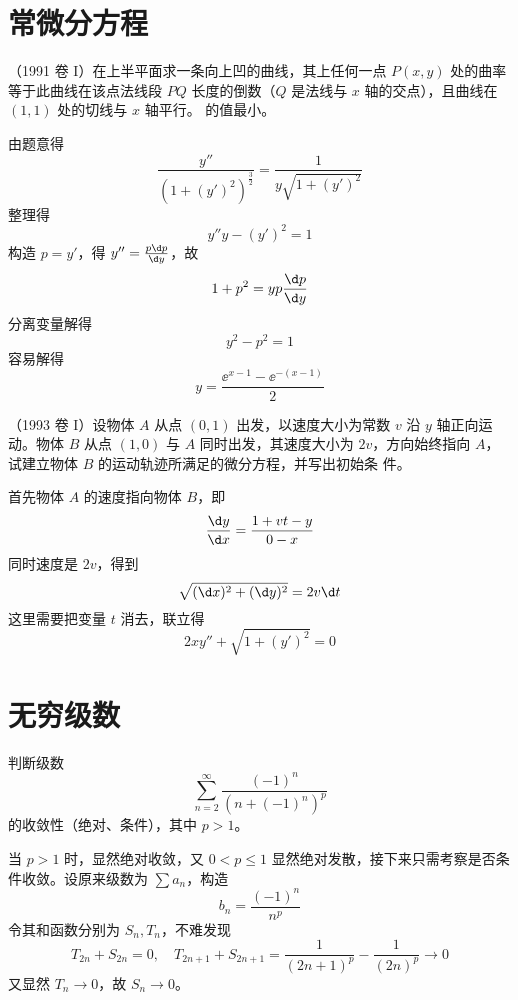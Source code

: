 \section{常微分方程}

\begin{problem}[000061]
（1991 卷 I）在上半平面求一条向上凹的曲线，其上任何一点 $P(x, y)$ 处的曲率等于此曲线在该点法线段 $PQ$ 长度的倒数（$Q$ 是法线与 $x$ 轴的交点），且曲线在 $(1, 1)$ 处的切线与 $x$ 轴平行。
的值最小。
\end{problem}

\begin{solution}
	由题意得
	\[ \frac{y''}{(1+(y')^2)^{\frac{3}{2}}} = \frac{1}{y \sqrt{1 + (y')^2}} \]
	整理得
	\[ y'' y - (y')^2 = 1 \]
	构造 $p = y'$，得 $y'' = \frac{p \d p}{\d y}$，故
	\[ 1 + p^2 = yp \frac{\d p}{\d y} \]
	分离变量解得
	\[ y^2 - p^2 = 1 \]
	容易解得
	\[ y = \frac{\ee^{x-1} - \ee^{-(x-1)}}{2} \]
\end{solution}

\begin{problem}[000063]
（1993 卷 I）设物体 $A$ 从点 $(0,1)$ 出发，以速度大小为常数 $v$ 沿 $y$ 轴正向运动。物体 $B$ 从点 $(1,0)$ 与 $A$ 同时出发，其速度大小为 $2v$，方向始终指向 $A$，试建立物体 $B$ 的运动轨迹所满足的微分方程，并写出初始条
件。
\end{problem}

\begin{solution}
	首先物体 $A$ 的速度指向物体 $B$，即
	\[ \frac{\d y}{\d x} = \frac{1 + vt - y}{0 - x} \]
	同时速度是 $2v$，得到
	\[ \sqrt{(\d x)^2 + (\d y)^2} = 2 v \d t \]
	这里需要把变量 $t$ 消去，联立得
	\[ 2 x y'' + \sqrt{1 + (y')^2} = 0 \]
\end{solution}

\section{无穷级数}

\begin{problem}[000065]
判断级数
\[ \sum_{n=2}^{\infty} \frac{(-1)^n}{\left(n + (-1)^n\right)^p} \]
的收敛性（绝对、条件），其中 $p > 1$。
\end{problem}

\begin{solution}
当 $p > 1$ 时，显然绝对收敛，又 $0 < p \leqslant 1$ 显然绝对发散，接下来只需考察是否条件收敛。设原来级数为 $\sum a_n$，构造
\[ b_n = \frac{(-1)^n}{n^p} \]
令其和函数分别为 $S_n, T_n$，不难发现
\[ T_{2n} + S_{2n} = 0, \quad T_{2n+1} + S_{2n+1} = \frac{1}{(2n+1)^p} - \frac{1}{(2n)^p} \to 0 \]
又显然 $T_n \to 0$，故 $S_n \to 0$。
\end{solution}


